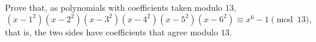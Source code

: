 Prove that, as polynomials with coefficients taken modulo $13$,
\[
(x-1^2)(x-2^2)(x-3^2)(x-4^2)(x-5^2)(x-6^2)\equiv x^6-1\pmod{13},
\]
that is, the two sides have coefficients that agree modulo $13$.
